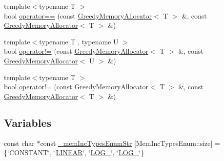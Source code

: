 \begin{DoxyCompactItemize}
\item 
{\footnotesize template$<$typename T $>$ }\\bool \hyperlink{namespaceuva_1_1smt_1_1tries_1_1alloc_a4148e630799431da09b14782fea4cc96}{operator==} (const \hyperlink{classuva_1_1smt_1_1tries_1_1alloc_1_1_greedy_memory_allocator}{Greedy\+Memory\+Allocator}$<$ T $>$ \&, const \hyperlink{classuva_1_1smt_1_1tries_1_1alloc_1_1_greedy_memory_allocator}{Greedy\+Memory\+Allocator}$<$ T $>$ \&)
\item 
{\footnotesize template$<$typename T , typename U $>$ }\\bool \hyperlink{namespaceuva_1_1smt_1_1tries_1_1alloc_a49f57a5b2c27ce6e2b8da7f15d1d44ad}{operator!=} (const \hyperlink{classuva_1_1smt_1_1tries_1_1alloc_1_1_greedy_memory_allocator}{Greedy\+Memory\+Allocator}$<$ T $>$ \&, const \hyperlink{classuva_1_1smt_1_1tries_1_1alloc_1_1_greedy_memory_allocator}{Greedy\+Memory\+Allocator}$<$ U $>$ \&)
\item 
{\footnotesize template$<$typename T $>$ }\\bool \hyperlink{namespaceuva_1_1smt_1_1tries_1_1alloc_ad691046a976d11527099d8792bb93e21}{operator!=} (const \hyperlink{classuva_1_1smt_1_1tries_1_1alloc_1_1_greedy_memory_allocator}{Greedy\+Memory\+Allocator}$<$ T $>$ \&, const \hyperlink{classuva_1_1smt_1_1tries_1_1alloc_1_1_greedy_memory_allocator}{Greedy\+Memory\+Allocator}$<$ T $>$ \&)
\end{DoxyCompactItemize}
\subsection*{Variables}
\begin{DoxyCompactItemize}
\item 
const char $\ast$const \hyperlink{namespaceuva_1_1smt_1_1tries_1_1alloc_a2ee2b31ccd454a61720cd6c0d7ca260c}{\+\_\+mem\+Inc\+Types\+Enum\+Str} \mbox{[}Mem\+Inc\+Types\+Enum\+::size\mbox{]} = \{\char`\"{}C\+O\+N\+S\+T\+A\+N\+T\char`\"{}, \char`\"{}\hyperlink{namespaceuva_1_1smt_1_1tries_1_1alloc_aa19a45a19458f601785f08cb24e17f16a449ea0b3eb9b0c835b97c605e4aa55b1}{L\+I\+N\+E\+A\+R}\char`\"{}, \char`\"{}\hyperlink{namespaceuva_1_1smt_1_1tries_1_1alloc_aa19a45a19458f601785f08cb24e17f16ada32950f90cdc18fd0012d770cfe72c1}{L\+O\+G\+\_}\char`\"{}, \char`\"{}\hyperlink{namespaceuva_1_1smt_1_1tries_1_1alloc_aa19a45a19458f601785f08cb24e17f16ac7ca374f77ae82f23dfaa3e206549f4c}{L\+O\+G\+\_}\char`\"{}\}
\end{DoxyCompactItemize}


